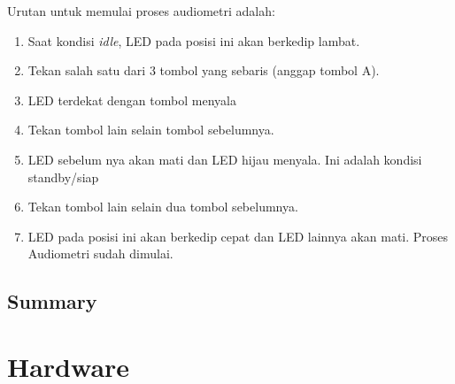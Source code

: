 \documentclass[12pt,]{article}
\begin{document}
	Urutan untuk memulai proses audiometri adalah:
	
	\begin{enumerate}
		\item Saat kondisi \textit{idle}, LED pada posisi ini akan berkedip lambat.
		
		\item Tekan salah satu dari 3 tombol yang sebaris (anggap tombol A).
		
		\item LED terdekat dengan tombol menyala
		
		\item Tekan tombol lain selain tombol sebelumnya.
		
		\item LED sebelum nya akan mati dan LED hijau menyala.
		Ini adalah kondisi standby/siap
		
		\item Tekan tombol lain selain dua tombol sebelumnya.
		
		\item LED pada posisi ini akan berkedip cepat dan LED lainnya akan mati.
		Proses Audiometri sudah dimulai.
		
		
	\end{enumerate}
	
	\newpage
	\subsection{Summary}

	\newpage
	\section{Hardware}
\end{document}
